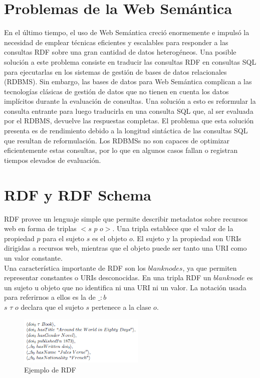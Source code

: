 \documentclass[10pt,a4paper]{article}
\begin{document}
\section{Problemas de la Web Semántica}
En el último tiempo, el uso de Web Semántica creció enormemente e impulsó la necesidad de emplear técnicas eficientes y escalables para responder a las consultas RDF sobre una gran cantidad de datos heterogéneos. Una posible solución a este problema consiste en traducir las consultas RDF en consultas SQL para ejecutarlas en los sistemas de gestión de bases de datos relacionales (RDBMS). Sin embargo, las bases de datos para Web Semántica complican a las tecnologías clásicas de gestión de datos que no tienen en cuenta los datos implícitos durante la evaluación de consultas. Una solución a esto es reformular la consulta entrante para luego traducirla en una consulta SQL que, al ser evaluada por el RDBMS, devuelve las respuestas completas. El problema que esta solución presenta es de rendimiento debido a la longitud sintáctica de las consultas SQL que resultan de reformulación. Los RDBMSs no son capaces de optimizar eficientemente estas consultas, por lo que en algunos casos fallan o registran tiempos elevados de evaluación.

\newpage
\section{RDF y RDF Schema}
RDF provee un lenguaje simple que permite describir metadatos sobre recursos web en forma de triplas $<s$ $p$ $o>$. Una tripla establece que el valor de la propiedad $p$ para el sujeto $s$ es el objeto $o$. El sujeto y la propiedad son URIs dirigidas a recursos web, mientras que el objeto puede ser tanto una URI como un valor constante. 
\\
Una característica importante de RDF son los $blank nodes$, ya que permiten representar constantes o URIs desconocidas. En una tripla RDF un $blank node$ es un sujeto u objeto que no identifica ni una URI ni un valor. La notación usada para referirnos a ellos es la de $\_ :b$
\\
$s$ $\tau$ $o$ declara que el sujeto $s$ pertenece a la clase $o$.
  
\begin{figure}[h]
\begin{center}
\includegraphics[width=170pt]{imgs/ejemplo_rdf}
\caption{Ejemplo de RDF}
\end{center}
\end{figure}
\end{document}
